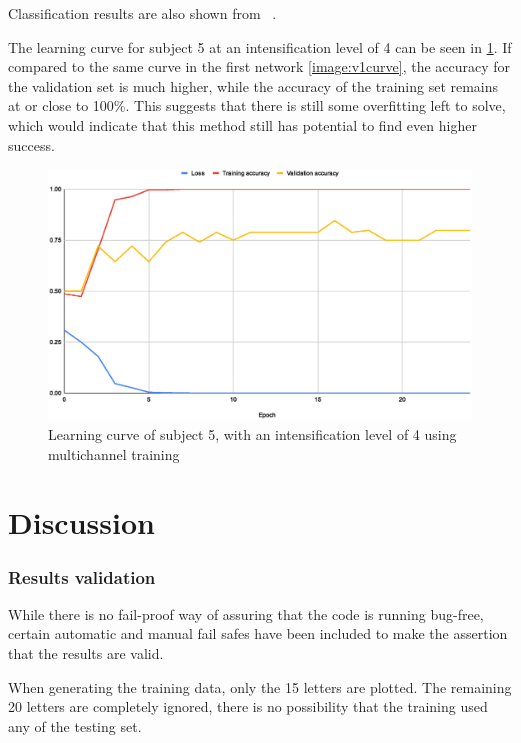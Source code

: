 \documentclass[conference]{IEEEtran}
\begin{document}
Classification results are also shown from ~\cite{Zhang.etal2020}.

The learning curve for subject 5 at an intensification level of 4 can be seen in \ref{image:v3curve}. If compared to the same curve in the first network \ref{image:v1curve}, the accuracy for the validation set is much higher, while the accuracy of the training set remains at or close to 100\%. This suggests that there is still some overfitting left to solve, which would indicate that this method still has potential to find even higher success.


\begin{figure}[h]
  \centering
  \includegraphics[width=\linewidth]{images/v3curve.eps}
  \caption[MSV16 Learning curve]{Learning curve of subject 5, with an intensification level of 4 using multichannel training}
  \label{image:v3curve}
\end{figure}




\section{Discussion}


\subsubsection{Results validation}
While there is no fail-proof way of assuring that the code is running bug-free, certain automatic and manual fail safes have been included to make the assertion that the results are valid.

When generating the training data, only the 15 letters are plotted. The remaining 20 letters are completely ignored, there is no possibility that the training used any of the testing set. 
\end{document}
